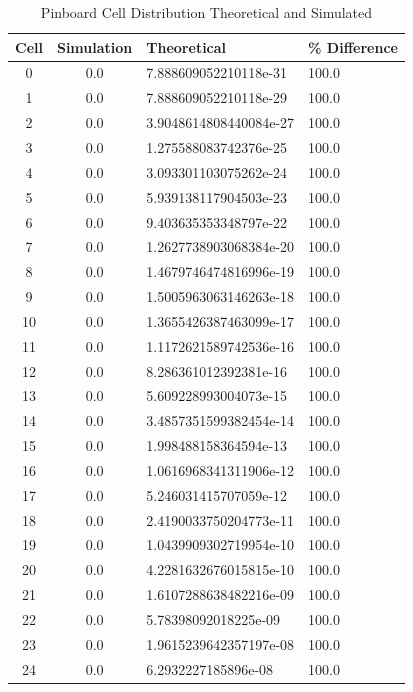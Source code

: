 \documentclass[11pt]{extarticle}
\begin{document}
\begin{enumerate}[(a)]
\begin{table}[ht!]
\label{PinboardTable100}
\caption{Pinboard Cell Distribution Theoretical and Simulated}
\tiny
\begin{minipage}{0.5\textwidth}
\begin{tabular}{ccll}
\toprule
\textbf{Cell} & \textbf{Simulation} & \textbf{Theoretical} & \textbf{\% Difference} \\
\midrule
0  &  0.0  &  7.888609052210118e-31  &  100.0 \\
1  &  0.0  &  7.888609052210118e-29  &  100.0 \\
2  &  0.0  &  3.9048614808440084e-27  &  100.0 \\
3  &  0.0  &  1.275588083742376e-25  &  100.0 \\
4  &  0.0  &  3.093301103075262e-24  &  100.0 \\
5  &  0.0  &  5.939138117904503e-23  &  100.0 \\
6  &  0.0  &  9.403635353348797e-22  &  100.0 \\
7  &  0.0  &  1.2627738903068384e-20  &  100.0 \\
8  &  0.0  &  1.4679746474816996e-19  &  100.0 \\
9  &  0.0  &  1.5005963063146263e-18  &  100.0 \\
10  &  0.0  &  1.3655426387463099e-17  &  100.0 \\
11  &  0.0  &  1.1172621589742536e-16  &  100.0 \\
12  &  0.0  &  8.286361012392381e-16  &  100.0 \\
13  &  0.0  &  5.609228993004073e-15  &  100.0 \\
14  &  0.0  &  3.4857351599382454e-14  &  100.0 \\
15  &  0.0  &  1.998488158364594e-13  &  100.0 \\
16  &  0.0  &  1.0616968341311906e-12  &  100.0 \\
17  &  0.0  &  5.246031415707059e-12  &  100.0 \\
18  &  0.0  &  2.4190033750204773e-11  &  100.0 \\
19  &  0.0  &  1.0439909302719954e-10  &  100.0 \\
20  &  0.0  &  4.2281632676015815e-10  &  100.0 \\
21  &  0.0  &  1.6107288638482216e-09  &  100.0 \\
22  &  0.0  &  5.78398092018225e-09  &  100.0 \\
23  &  0.0  &  1.9615239642357197e-08  &  100.0 \\
24  &  0.0  &  6.2932227185896e-08  &  100.0 \\

\end{tabular}
\end{minipage}
\end{table}
\end{enumerate}
\end{document}
